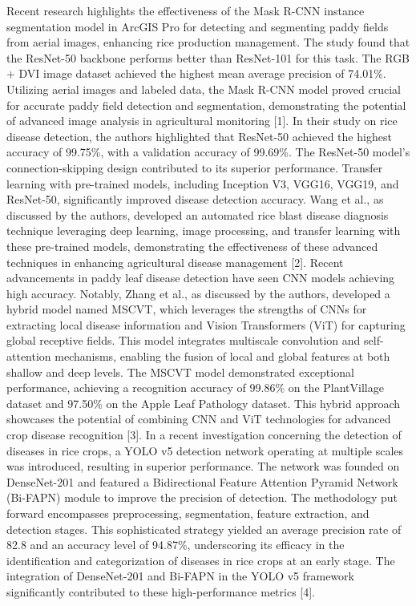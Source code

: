\documentclass[conference]{IEEEtran}
\begin{document}
Recent research highlights the effectiveness of the Mask R-CNN instance segmentation model in ArcGIS Pro for detecting and segmenting paddy fields from aerial images, enhancing rice production management. The study found that the ResNet-50 backbone performs better than ResNet-101 for this task. The RGB + DVI image dataset achieved the highest mean average precision of 74.01\%. Utilizing aerial images and labeled data, the Mask R-CNN model proved crucial for accurate paddy field detection and segmentation, demonstrating the potential of advanced image analysis in agricultural monitoring [1].
In their study on rice disease detection, the authors highlighted that ResNet-50 achieved the highest accuracy of 99.75\%, with a validation accuracy of 99.69\%. The ResNet-50 model's connection-skipping design contributed to its superior performance. Transfer learning with pre-trained models, including Inception V3, VGG16, VGG19, and ResNet-50, significantly improved disease detection accuracy. Wang et al., as discussed by the authors, developed an automated rice blast disease diagnosis technique leveraging deep learning, image processing, and transfer learning with these pre-trained models, demonstrating the effectiveness of these advanced techniques in enhancing agricultural disease management [2].
Recent advancements in paddy leaf disease detection have seen CNN models achieving high accuracy. Notably, Zhang et al., as discussed by the authors, developed a hybrid model named MSCVT, which leverages the strengths of CNNs for extracting local disease information and Vision Transformers (ViT) for capturing global receptive fields. This model integrates multiscale convolution and self-attention mechanisms, enabling the fusion of local and global features at both shallow and deep levels. The MSCVT model demonstrated exceptional performance, achieving a recognition accuracy of 99.86\% on the PlantVillage dataset and 97.50\% on the Apple Leaf Pathology dataset. This hybrid approach showcases the potential of combining CNN and ViT technologies for advanced crop disease recognition [3].
In a recent investigation concerning the detection of diseases in rice crops, a YOLO v5 detection network operating at multiple scales was introduced, resulting in superior performance. The network was founded on DenseNet-201 and featured a Bidirectional Feature Attention Pyramid Network (Bi-FAPN) module to improve the precision of detection. The methodology put forward encompasses preprocessing, segmentation, feature extraction, and detection stages. This sophisticated strategy yielded an average precision rate of 82.8 and an accuracy level of 94.87\%, underscoring its efficacy in the identification and categorization of diseases in rice crops at an early stage. The integration of DenseNet-201 and Bi-FAPN in the YOLO v5 framework significantly contributed to these high-performance metrics [4].
\end{document}
